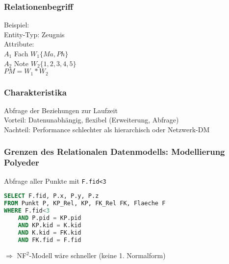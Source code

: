 \subsubsection{Relationenbegriff}
Beispiel:\\
Entity-Typ: Zeugnis\\
Attribute:\\
$A_1$ Fach $W_1\{Ma,Ph\}$\\
$A_2$ Note $W_2\{1,2,3,4,5\}$\\
$PM=W_1*W_2$
\subsubsection{Charakteristika}
Abfrage der Beziehungen zur Laufzeit\\
Vorteil: Datenunabhängig, flexibel (Erweiterung, Abfrage)\\
Nachteil: Performance schlechter als hierarchisch oder Netzwerk-DM

\subsubsection{Grenzen des Relationalen Datenmodells: Modellierung Polyeder}
Abfrage aller Punkte mit \lstinline|F.fid<3|
\begin{lstlisting}[language=SQL]
SELECT F.fid, P.x, P.y, P.z
FROM Punkt P, KP_Rel, KP, FK_Rel FK, Flaeche F
WHERE F.fid<3
	AND P.pid = KP.pid
	AND KP.kid = K.kid
	AND K.kid = FK.kid
	AND FK.fid = F.fid
\end{lstlisting}
$\Rightarrow$ NF$^2$-Modell wäre schneller (keine 1. Normalform)


